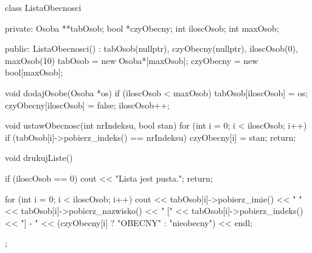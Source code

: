 class ListaObecnosci {
private:
    Osoba **tabOsob;
    bool *czyObecny;
    int iloscOsob;
    int maxOsob;

public:
    ListaObecnosci() : tabOsob(nullptr), czyObecny(nullptr), iloscOsob(0), maxOsob(10) {
        tabOsob = new Osoba*[maxOsob];
        czyObecny = new bool[maxOsob];
    }

    void dodajOsobe(Osoba *os) {
        if (iloscOsob < maxOsob) {
            tabOsob[iloscOsob] = os;
            czyObecny[iloscOsob] = false;
            iloscOsob++;
        }
    }

    void ustawObecnosc(int nrIndeksu, bool stan) {
        for (int i = 0; i < iloscOsob; i++) {
            if (tabOsob[i]->pobierz_indeks() == nrIndeksu) {
                czyObecny[i] = stan;
                return;
            }
        }
    }

    void drukujListe() {
        if (iloscOsob == 0) {
            cout << "Lista jest pusta.\n";
            return;
        }

        for (int i = 0; i < iloscOsob; i++) {
            cout << tabOsob[i]->pobierz_imie() << " "
                 << tabOsob[i]->pobierz_nazwisko()
                 << " [" << tabOsob[i]->pobierz_indeks() << "] - "
                 << (czyObecny[i] ? "OBECNY" : "nieobecny") << endl;
        }
    }
};


